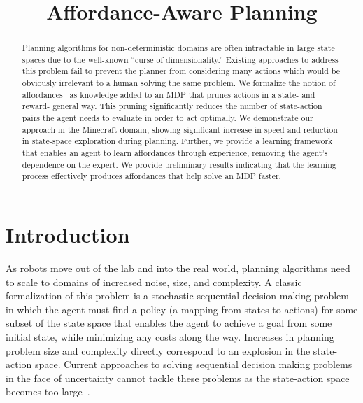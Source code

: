 \documentclass[conference]{IEEEtran}
\begin{document}
\title{Affordance-Aware Planning}

\author{
}

\maketitle

\begin{abstract}
Planning algorithms for non-deterministic domains are often
intractable in large state spaces due to the well-known ``curse of
dimensionality.'' Existing approaches to address this problem fail to
prevent the planner from considering many actions which would be
obviously irrelevant to a human solving the same problem. We formalize the notion of affordances~\citep{gibson77} 
as knowledge added to an MDP that prunes actions in a state- and reward- general
way. This pruning significantly reduces the number of state-action
pairs the agent needs to evaluate in order to act optimally. We
demonstrate our approach in the Minecraft domain, showing significant
increase in speed and reduction in state-space exploration during planning. Further, we provide a
learning framework that enables an agent to learn affordances through
experience, removing the agent's dependence on the expert. We provide
preliminary results indicating that the learning process effectively
produces affordances that help solve an MDP faster.
\end{abstract}

\IEEEpeerreviewmaketitle

\section{Introduction}
\label{sec:introduction}
As robots move out of the lab and into the real world, planning
algorithms need to scale to domains of increased noise, size, and
complexity.  A classic formalization of this problem is a stochastic
sequential decision making problem in which the agent must find a
policy (a mapping from states to actions) for some subset of the state
space that enables the agent to achieve a goal from some initial
state, while minimizing any costs along the way.
Increases in planning problem size and complexity directly correspond
to an explosion in the state-action space. Current approaches to solving 
sequential decision making problems in the face of uncertainty cannot tackle these problems 
as the state-action space becomes too large~\citep{grounds05}.
\end{document}
